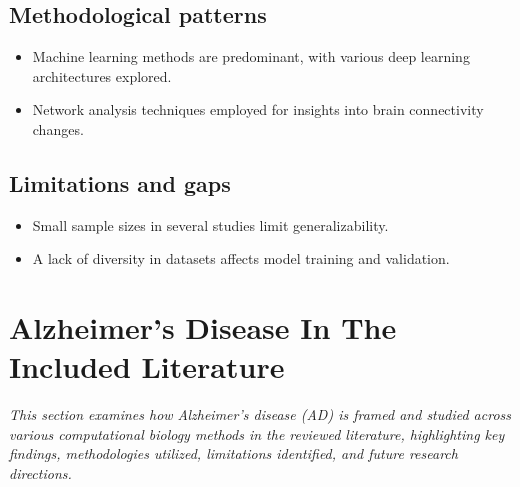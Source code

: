 \documentclass{MITcsail}
\begin{document}
\subsection*{Methodological patterns}
\begin{itemize}
  \item Machine learning methods are predominant, with various deep learning architectures explored.
  \item Network analysis techniques employed for insights into brain connectivity changes.
\end{itemize}

\subsection*{Limitations and gaps}
\begin{itemize}
  \item Small sample sizes in several studies limit generalizability.
  \item A lack of diversity in datasets affects model training and validation.
\end{itemize}

\section{Alzheimer's Disease In The Included Literature}

\textit{This section examines how Alzheimer's disease (AD) is framed and studied across various computational biology methods in the reviewed literature, highlighting key findings, methodologies utilized, limitations identified, and future research directions.}
\end{document}
